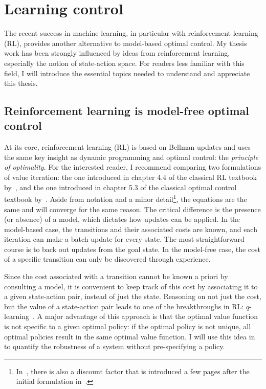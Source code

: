 \section{Learning control}

The recent success in machine learning, in particular with reinforcement learning (RL), provides another alternative to model-based optimal control. My thesis work has been strongly influenced by ideas from reinforcement learning, especially the notion of state-action space. For readers less familiar with this field, I will introduce the essential topics needed to understand and appreciate this thesis.

\subsection{Reinforcement learning is model-free optimal control}
At its core, reinforcement learning (RL) is based on Bellman updates and uses the same key insight as dynamic programming and optimal control: the \emph{principle of optimality}.
For the interested reader, I recommend comparing two formulations of value iteration: the one introduced in chapter 4.4 of the classical RL textbook by~\textcite{sutton2018book}, and the one introduced in chapter 5.3 of the classical optimal control textbook by~\textcite{bertsekas2017book}. Aside from notation and a minor detail\footnote{In~\cite{sutton2018book}, there is also a discount factor that is introduced a few pages after the initial formulation in~\cite{bertsekas2017book}.}, the equations are the same and will converge for the same reason. The critical difference is the presence (or absence) of a model, which dictates how updates can be applied.
In the model-based case, the transitions and their associated costs are known, and each iteration can make a batch update for every state. The most straightforward course is to back out updates from the goal state. In the model-free case, the cost of a specific transition can only be discovered through experience. \par
Since the cost associated with a transition cannot be known a priori by consulting a model, it is convenient to keep track of this cost by associating it to a given state-action pair, instead of just the state. Reasoning on not just the cost, but the value of a state-action pair leads to one of the breakthroughs in RL: $q$-learning~\cite[cf. chapter 6.5]{sutton2018book}. A major advantage of this approach is that the optimal value function is not specific to a given optimal policy: if the optimal policy is not unique, all optimal policies result in the same optimal value function. I will use this idea in~\cite{heim2019beyond} to quantify the robustness of a system without pre-specifying a policy.

